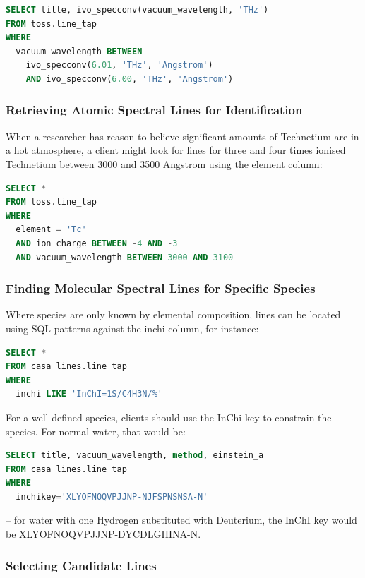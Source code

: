 \documentclass[11pt,a4paper]{ivoa}
\begin{document}
\begin{lstlisting}[language=SQL]
SELECT title, ivo_specconv(vacuum_wavelength, 'THz')
FROM toss.line_tap
WHERE
  vacuum_wavelength BETWEEN
    ivo_specconv(6.01, 'THz', 'Angstrom')
    AND ivo_specconv(6.00, 'THz', 'Angstrom')
\end{lstlisting}


\subsubsection{Retrieving Atomic Spectral Lines for Identification}

When a researcher has reason to believe significant amounts of
Technetium are in a hot atmosphere, a client might look for lines for
three and four times ionised Technetium between 3000 and
3500 Angstrom using the element column:

\begin{lstlisting}[language=SQL]
SELECT *
FROM toss.line_tap
WHERE
  element = 'Tc'
  AND ion_charge BETWEEN -4 AND -3
  AND vacuum_wavelength BETWEEN 3000 AND 3100
\end{lstlisting}


\subsubsection{Finding Molecular Spectral Lines for Specific Species}

Where species are only known by elemental composition, lines can be
located using SQL patterns against the inchi column, for instance:

\begin{lstlisting}[language=SQL]
SELECT *
FROM casa_lines.line_tap
WHERE
  inchi LIKE 'InChI=1S/C4H3N/%'
\end{lstlisting}

For a well-defined species, clients should use the InChi key to
constrain the species.  For
normal water, that would be:

\begin{lstlisting}[language=SQL]
SELECT title, vacuum_wavelength, method, einstein_a
FROM casa_lines.line_tap
WHERE
  inchikey='XLYOFNOQVPJJNP-NJFSPNSNSA-N'
\end{lstlisting}

\noindent -- for water with one Hydrogen substituted
with Deuterium, the InChI key
would be XLYOFNOQVPJJNP-DYCDLGHINA-N.

\subsubsection{Selecting Candidate Lines}
\end{document}
